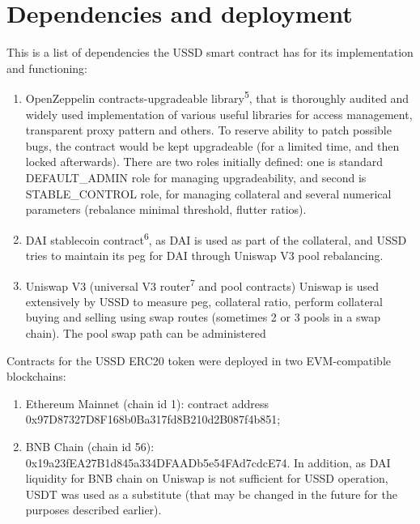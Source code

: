 \section{Dependencies and deployment}

This is a list of dependencies the USSD smart contract has for its implementation
and functioning:

\begin{enumerate}
  \item OpenZeppelin contracts-upgradeable library\textsuperscript{5}, that is 
  thoroughly audited and widely used implementation of various useful libraries for 
  access management, transparent proxy pattern and others. To reserve ability to 
  patch possible bugs, the contract would be kept upgradeable (for a limited time, 
  and then locked afterwards). There are two roles initially defined: one is standard
  DEFAULT\_ADMIN role for managing upgradeability, and second is STABLE\_CONTROL role,
  for managing collateral and several numerical parameters (rebalance minimal threshold,
  flutter ratios).
  \item DAI stablecoin contract\textsuperscript{6}, as     
       DAI is used as part of the collateral, and USSD tries to maintain its peg for DAI
       through Uniswap V3 pool rebalancing.
  \item Uniswap V3 (universal V3 router\textsuperscript{7} and pool contracts)
       Uniswap is used extensively by USSD to measure peg, collateral ratio, 
       perform collateral buying and selling using swap routes (sometimes 2 or 3 pools
       in a swap chain). The pool swap path can be administered
\end{enumerate}


\addtocounter{footnote}{1}
\addtocounter{footnote}{1}
\addtocounter{footnote}{1}

Contracts for the USSD ERC20 token were deployed in two EVM-compatible blockchains:

\begin{enumerate}
  \item Ethereum Mainnet (chain id 1): contract address \newline
0x97D87327D8F168b0Ba317fd8B210d2B087f4b851;
  \item BNB Chain (chain id 56): 0x19a23fEA27B1d845a334DFAADb5e54FAd7cdcE74. In addition, as DAI liquidity
for BNB chain on Uniswap is not sufficient for USSD operation, USDT was used as a substitute (that may be changed
in the future for the purposes described earlier).
\end{enumerate}



